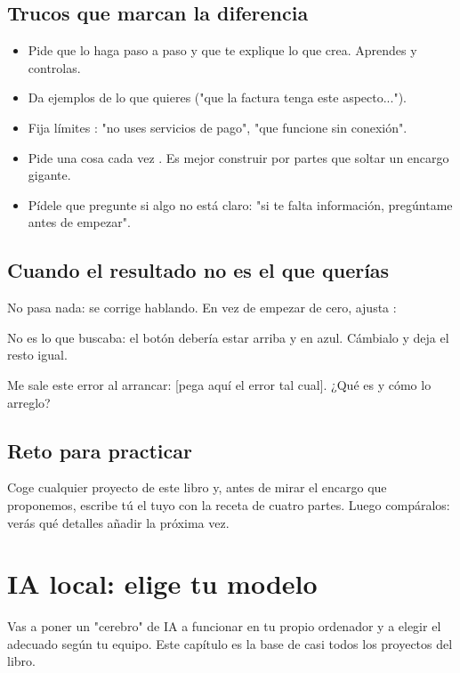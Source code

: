 \documentclass[11pt,a4paper]{book}
\begin{document}
\section{Trucos que marcan la diferencia}
\begin{itemize}\item Pide que lo haga paso a paso y que te explique lo que crea. Aprendes y controlas.\end{itemize}
\begin{itemize}\item Da ejemplos de lo que quieres ("que la factura tenga este aspecto...").\end{itemize}
\begin{itemize}\item Fija límites : "no uses servicios de pago", "que funcione sin conexión".\end{itemize}
\begin{itemize}\item Pide una cosa cada vez . Es mejor construir por partes que soltar un encargo gigante.\end{itemize}
\begin{itemize}\item Pídele que pregunte si algo no está claro: "si te falta información, pregúntame antes de empezar".\end{itemize}
\section{Cuando el resultado no es el que querías}
No pasa nada: se corrige hablando. En vez de empezar de cero, ajusta :

\begin{codebox}
No es lo que buscaba: el botón debería estar arriba y en azul. Cámbialo y deja el resto igual.
\end{codebox}
\begin{codebox}
Me sale este error al arrancar: [pega aquí el error tal cual]. ¿Qué es y cómo lo arreglo?
\end{codebox}
\section{Reto para practicar}
Coge cualquier proyecto de este libro y, antes de mirar el encargo que proponemos, escribe tú el tuyo con la receta de cuatro partes. Luego compáralos: verás qué detalles añadir la próxima vez.

\chapter{IA local: elige tu modelo}
Vas a poner un "cerebro" de IA a funcionar en tu propio ordenador y a elegir el adecuado según tu equipo. Este capítulo es la base de casi todos los proyectos del libro.
\end{document}
